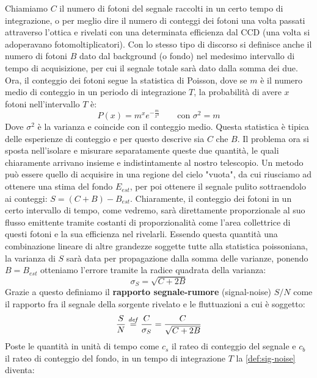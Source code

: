 Chiamiamo $C$ il numero di fotoni del segnale raccolti in un certo tempo di integrazione, o per meglio dire il numero di conteggi dei fotoni una volta passati attraverso l'ottica e rivelati con una determinata efficienza dal CCD (una volta si adoperavano fotomoltiplicatori). Con lo stesso tipo di discorso si definisce anche il numero di fotoni $B$ dato dal background (o fondo) nel medesimo intervallo di tempo di acquisizione, per cui il segnale totale sarà dato dalla somma dei due. Ora, il conteggio dei fotoni segue la statistica di Poisson, dove se $m$ è il numero medio di conteggio in un periodo di integrazione $T$, la probabilità di avere $x$ fotoni nell'intervallo $T$ è:
\begin{equation}
    P(x)=m^xe^{-\frac{m}{x^2}} \qquad \text{con } \sigma^2=m
\end{equation}
Dove $\sigma^2$ è la varianza e coincide con il conteggio medio. Questa statistica è tipica delle esperienze di conteggio e per questo descrive sia $C$ che $B$. Il problema ora si sposta nell'isolare e misurare separatamente queste due quantità, le quali chiaramente arrivano insieme e indistintamente al nostro telescopio. Un metodo può essere quello di acquisire in una regione del cielo "vuota", da cui riusciamo ad ottenere una stima del fondo $E_{est}$, per poi ottenere il segnale pulito sottraendolo ai conteggi: $S=(C+B)-B_{est}$. Chiaramente, il conteggio dei fotoni in un certo intervallo di tempo, come vedremo, sarà direttamente proporzionale al suo flusso emittente tramite costanti di proporzionalità come l'area collettrice di questi fotoni e la sua efficienza nel rivelarli. Essendo questa quantità una combinazione lineare di altre grandezze soggette tutte alla statistica poissoniana, la varianza di $S$ sarà data per propagazione dalla somma delle varianze, ponendo $B=B_{est}$ otteniamo l'errore tramite la radice quadrata della varianza:
\begin{equation*}
    \sigma_S=\sqrt{C+2B}
\end{equation*}
Grazie a questo definiamo il \textbf{rapporto segnale-rumore} (signal-noise) $S/N$ come il rapporto fra il segnale della sorgente rivelato e le fluttuazioni a cui è soggetto:
\begin{equation}
    \label{def:sig-noise}
    \frac{S}{N} \overset{\mathit{def}}{=} \frac{C}{\sigma_S} = \frac{C}{\sqrt{C+2B}}
\end{equation}
Poste le quantità in unità di tempo come $c_s$ il rateo di conteggio del segnale e $c_b$ il rateo di conteggio del fondo, in un tempo di integrazione $T$ la \ref{def:sig-noise} diventa:

